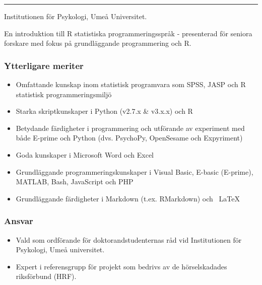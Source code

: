\documentclass[]{article}
\providecommand{\tightlist}{%
  \setlength{\itemsep}{0pt}\setlength{\parskip}{0pt}}
\begin{document}
\hrule
\begin{changemargin}{2.15cm}{2.4cm}


Institutionen för Psykologi, Umeå Universitet.

En introduktion till R statistiska programmeringsspråk - presenterad för seniora forskare med fokus på grundläggande programmering och R.

\end{changemargin}

\hypertarget{ytterligare-meriter}{%
\subsubsection{Ytterligare meriter}\label{ytterligare-meriter}}

\begin{itemize}
\tightlist
\item
  Omfattande kunskap inom statistisk programvara som SPSS, JASP och R
  statistisk programmeringsmiljö
\item
  Starka skriptkunskaper i Python (v2.7.x \& v3.x.x) och R
\item
  Betydande färdigheter i programmering och utförande av experiment med
  både E-prime och Python (dvs. PsychoPy, OpenSesame och Expyriment)
\item
  Goda kunskaper i Microsoft Word och Excel
\item
  Grundläggande programmeringskunskaper i Visual Basic, E-basic
  (E-prime), MATLAB, Bash, JavaScript och PHP
\item
  Grundläggande färdigheter i Markdown (t.ex. RMarkdown) och ~LaTeX
\end{itemize}

\hypertarget{ansvar}{%
\subsubsection{Ansvar}\label{ansvar}}

\begin{itemize}
\tightlist
\item
  Vald som ordförande för doktorandstudenternas råd vid Institutionen
  för Psykologi, Umeå universitet.
\item
  Expert i referensgrupp för projekt som bedrivs av de hörselskadades
  riksförbund (HRF).
\end{itemize}

\newpage
\pagestyle{empty}
\end{document}
